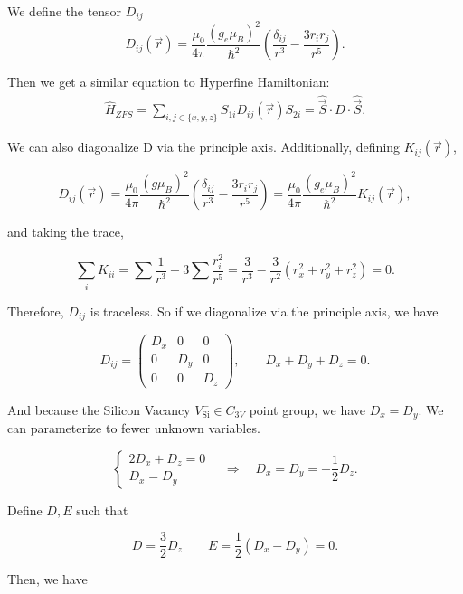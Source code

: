 \documentclass[svgnames]{article}
\begin{document}
We define the tensor $D_{ij}$ 
\[
    D_{ij} (\vec{r}) = \frac{\mu_0}{4\pi} \frac{(g_e\mu_B)^2}{\hbar^2} \left(
    \frac{\delta_{ij}}{r^3} - \frac{3r_ir_j}{r^5} \right).   
\] \vspace{3px}

Then we get a similar equation to Hyperfine Hamiltonian: 
    \begin{align} 
        \hat{H}_{ZFS} = \sum_{i,j \in \{x, y, z\}}^{}  S_{1i} D_{ij}(\vec{r})
        S_{2i} = \hat{\vec{S}} \cdot D \cdot \hat{\vec{S}}. 
    \end{align} 

We can also diagonalize D via the principle axis. Additionally, defining
$K_{ij}(\vec{r})$, 

\[
    D_{ij}(\vec{r}) = \frac{\mu_0}{4\pi} \frac{(g\mu_B)^2}{\hbar^2} \left(
    \frac{\delta_{ij}}{r^3} - \frac{3r_i r_j}{r^5} \right) = \frac{\mu_0}{4\pi}
    \frac{(g_e\mu_B)^2}{\hbar^2} K_{ij}(\vec{r}),
\] \vspace{3px}

and taking the trace, 

\[
    \sum_i K_{ii} = \sum \frac{1}{r^3} - 3\sum \frac{r_i^2}{r^5} = \frac{3}{r^3} -
\frac{3}{r^2}(r_x^2 + r_y^2 + r_z^2) = 0. 
\] \vspace{3px}

Therefore, $D_{ij}$ is traceless. So if we diagonalize via the principle axis,
we have 

 \[
     D_{ij} = \begin{pmatrix}
    D_x & 0 & 0 \\ 
    0 & D_y & 0 \\ 
    0 & 0 & D_z 
\end{pmatrix}, \qquad D_x + D_y + D_z = 0. 
\] \vspace{3px}

And because the Silicon Vacancy $V_\text{Si}^- \in C_{3V}$ point group, we
have $D_x = D_y$. We can parameterize to fewer unknown variables.  

\[
\begin{cases}
    2D_x + D_z = 0 \\
               D_x = D_y 
\end{cases} \quad \Rightarrow \quad D_x = D_y = -\frac{1}{2}D_z. 
\] \vspace{3px}

Define $D, E$ such that 

 \[
D = \frac{3}{2}D_z \qquad E = \frac{1}{2}(D_x - D_y) = 0. 
\]

Then, we have 
\end{document}
